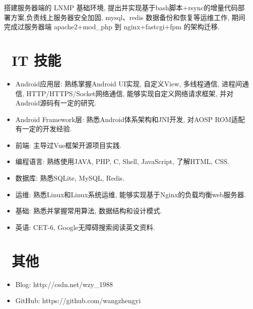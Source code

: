 \documentclass{resume}
\begin{document}
\begin{onehalfspacing}
搭建服务器端的 LNMP 基础环境, 提出并实现基于bash脚本+rsync的增量代码部署方案,负责线上服务器安全加固, mysql、redis 数据备份和恢复等运维工作, 期间完成过服务器端 apache2+mod\_php 到 nginx+fastcgi+fpm 的架构迁移.
\end{onehalfspacing}


\section{\faCogs\ IT 技能}
\begin{itemize}[parsep=0.5ex]
  \item Android应用层: 熟练掌握Android UI实现, 自定义View, 多线程通信, 进程间通信, HTTP/HTTPS/Socket网络通信, 能够实现自定义网络请求框架, 并对Android源码有一定的研究.
  \item Android Framework层: 熟悉Android体系架构和JNI开发, 对AOSP ROM适配有一定的开发经验.
  \item 前端: 主导过Vue框架开源项目实践.
  \item 编程语言: 熟练使用JAVA, PHP, C, Shell, JavaScript, 了解HTML, CSS.
  \item 数据库: 熟悉SQLite, MySQL, Redis.
  \item 运维: 熟悉Linux和Linux系统运维, 能够实现基于Nginx的负载均衡web服务器.
  \item 基础: 熟悉并掌握常用算法, 数据结构和设计模式.
  \item 英语: CET-6, Google无障碍搜索阅读英文资料.
\end{itemize}

\section{\faInfo\ 其他}
\begin{itemize}[parsep=0.5ex]
  \item Blog: http://csdn.net/wzy\_1988
  \item GitHub: https://github.com/wangzhengyi
\end{itemize}

%
%
\end{document}
